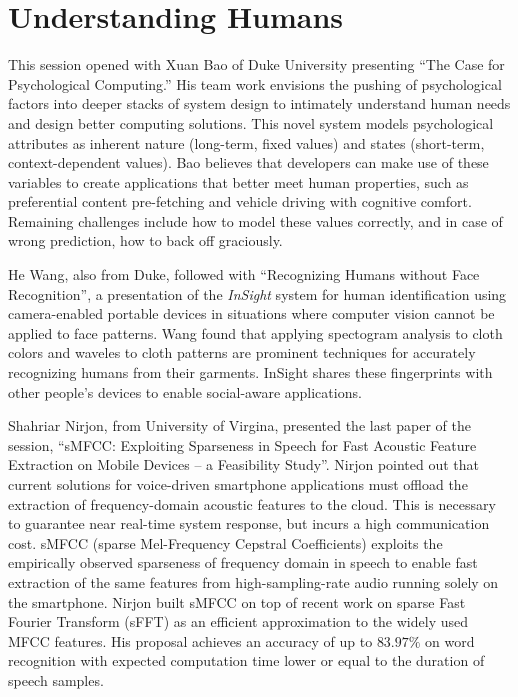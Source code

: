 \section{Understanding Humans}
\label{sec:humans}

This session opened with Xuan Bao of Duke University presenting ``The
Case for Psychological Computing.'' His team work envisions the pushing
of psychological factors into deeper stacks of system design to
intimately understand human needs and design better computing solutions.
This novel system models psychological attributes as inherent nature
(long-term, fixed values) and states (short-term, context-dependent
values).  Bao believes that developers can make use of these variables
to create applications that better meet human properties, such as
preferential content pre-fetching and vehicle driving with cognitive
comfort. Remaining challenges include how to model these values
correctly, and in case of wrong prediction, how to back off graciously.

He Wang, also from Duke, followed with ``Recognizing Humans without Face
Recognition'', a presentation of the \emph{InSight} system for human
identification using camera-enabled portable devices in situations where
computer vision cannot be applied to face patterns. Wang found that
applying spectogram analysis to cloth colors and waveles to cloth
patterns are prominent techniques for accurately recognizing humans from
their garments. InSight shares these fingerprints with other people's
devices to enable social-aware applications.

Shahriar Nirjon, from University of Virgina, presented the last paper of
the session, ``sMFCC: Exploiting Sparseness in Speech for Fast Acoustic
Feature Extraction on Mobile Devices -- a Feasibility Study''. Nirjon
pointed out that current solutions for voice-driven smartphone
applications must offload the extraction of frequency-domain acoustic
features to the cloud. This is necessary to guarantee near real-time
system response, but incurs a high communication cost. sMFCC (sparse
Mel-Frequency Cepstral Coefficients) exploits the empirically observed
sparseness of frequency domain in speech to enable fast extraction of
the same features from high-sampling-rate audio running solely on the
smartphone. Nirjon built sMFCC on top of recent work on sparse Fast
Fourier Transform (sFFT) as an efficient approximation to the widely
used MFCC features. His proposal achieves an accuracy of up to $83.97\%$
on word recognition with expected computation time lower or equal to the
duration of speech samples.

